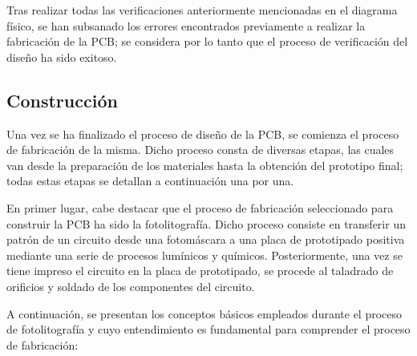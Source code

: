 Tras realizar todas las verificaciones anteriormente mencionadas en el diagrama físico, se han subsanado los errores encontrados previamente a realizar la fabricación de la \ac{PCB}; se considera por lo tanto que el proceso de verificación del diseño ha sido exitoso.

\subsection{Construcción}

Una vez se ha finalizado el proceso de diseño de la \ac{PCB}, se comienza el proceso de fabricación de la misma. Dicho proceso consta de diversas etapas, las cuales van desde la preparación de los materiales hasta la obtención del prototipo final; todas estas etapas se detallan a continuación una por una.

En primer lugar, cabe destacar que el proceso de fabricación seleccionado para construir la \ac{PCB} ha sido la fotolitografía. Dicho proceso consiste en transferir un patrón de un circuito desde una fotomáscara a una placa de prototipado positiva mediante una serie de procesos lumínicos y químicos. Posteriormente, una vez se tiene impreso el circuito en la placa de prototipado, se procede al taladrado de orificios y soldado de los componentes del circuito.

A continuación, se presentan los conceptos básicos empleados durante el proceso de fotolitografía y cuyo entendimiento es fundamental para comprender el proceso de fabricación:

